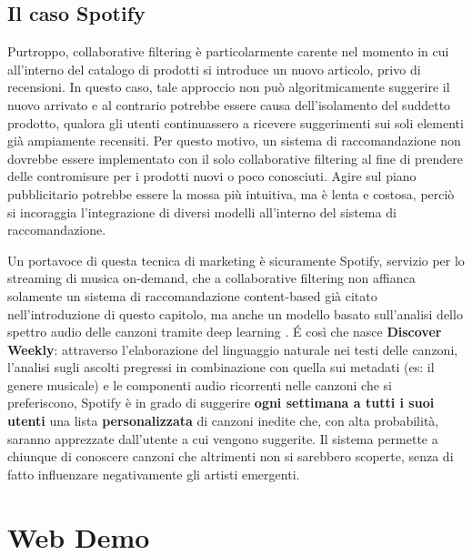 \documentclass[hidelinks, 12pt]{article}
\begin{document}
\subsection{Il caso Spotify}
\label{sec:spotify}

Purtroppo, collaborative filtering è particolarmente carente nel momento in cui all'interno del catalogo di prodotti si introduce un nuovo articolo, privo di recensioni. In questo caso, tale approccio non può algoritmicamente suggerire il nuovo arrivato e al contrario potrebbe essere causa dell'isolamento del suddetto prodotto, qualora gli utenti continuassero a ricevere suggerimenti sui soli elementi già ampiamente recensiti. Per questo motivo, un sistema di raccomandazione non dovrebbe essere implementato con il solo collaborative filtering al fine di prendere delle contromisure per i prodotti nuovi o poco conosciuti. Agire sul piano pubblicitario potrebbe essere la mossa più intuitiva, ma è lenta e costosa, perciò si incoraggia l'integrazione di diversi modelli all'interno del sistema di raccomandazione.

Un portavoce di questa tecnica di marketing è sicuramente Spotify\cite{site:spotify}, servizio per lo streaming di musica on-demand, che a collaborative filtering non affianca solamente un sistema di raccomandazione content-based già citato nell'introduzione di questo capitolo, ma anche un modello basato sull'analisi dello spettro audio delle canzoni tramite deep learning \cite{site:spotify-article}. É così che nasce \textbf{Discover Weekly}\cite{site:spotify-discover}: attraverso l'elaborazione del linguaggio naturale nei testi delle canzoni, l'analisi sugli ascolti pregressi in combinazione con quella sui metadati (es: il genere musicale) e le componenti audio ricorrenti nelle canzoni che si preferiscono, Spotify è in grado di suggerire \textbf{ogni settimana a tutti i suoi utenti} una lista \textbf{personalizzata} di canzoni inedite che, con alta probabilità, saranno apprezzate dall'utente a cui vengono suggerite. Il sistema permette a chiunque di conoscere canzoni che altrimenti non si sarebbero scoperte, senza di fatto influenzare negativamente gli artisti emergenti.



\clearpage



\section{Web Demo}
\label{sec:ui}
\end{document}
